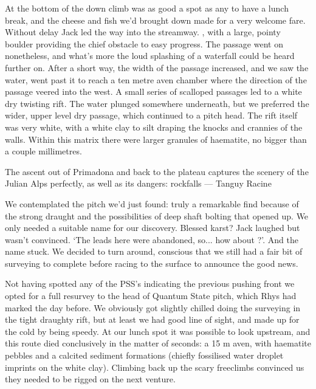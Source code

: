 At the bottom of the down climb was as good a spot as any to have a lunch break, and the cheese and fish we'd brought down made for a very welcome fare. Without delay Jack led the way into the streamway. , with a large, pointy boulder providing the chief obstacle to easy progress. The passage went on nonetheless, and what's more the loud splashing of a waterfall could be heard further on. After a short way, the width of the passage increased, and we saw the water, went past it to reach a ten metre aven chamber where the direction of the passage veered into the west. A small series of scalloped passages led to a white dry twisting rift. The water plunged somewhere underneath, but we preferred the wider, upper level dry passage, which continued to a pitch head. The rift itself was very white, with a white clay to silt draping the knocks and crannies of the walls. Within this matrix there were larger granules of haematite, no bigger than a couple millimetres. 

\begin{marginfigure}
\centering
{}
\caption{The ascent out of Primadona and back to the plateau captures the scenery of the Julian Alps perfectly, as well as its dangers: rockfalls --- Tanguy Racine}
\label{wstern cliffs}
\end{marginfigure}

We contemplated the pitch we'd just found: truly a remarkable find because of the strong draught and the possibilities of deep shaft bolting that opened up. We only needed a suitable name for our discovery. Blessed karst? Jack laughed but wasn't convinced. `The leads here were abandoned, so... how about ?'. And the name stuck. We decided to turn around, conscious that we still had a fair bit of surveying to complete before racing to the surface to announce the good news. 


Not having spotted any of the PSS's indicating the previous pushing front we opted for a full resurvey to the head of Quantum State pitch, which Rhys had marked the day before. We obviously got slightly chilled doing the surveying in the tight draughty rift, but at least we had good line of sight, and made up for the cold by being speedy. At our lunch spot it was possible to look upstream, and this route died conclusively in the matter of seconds: a 15 m aven, with haematite pebbles and a calcited sediment formations (chiefly fossilised water droplet imprints on the white clay). Climbing back up the scary freeclimbs convinced us they needed to be rigged on the next venture. 

